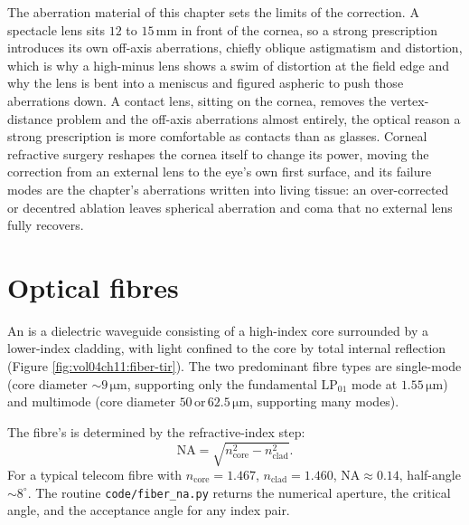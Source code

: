 The aberration material of this chapter sets the limits of the correction. A
spectacle lens sits $12$ to $15\,\si{\milli\meter}$ in front of the cornea, so a
strong prescription introduces its own off-axis aberrations, chiefly oblique
astigmatism and distortion, which is why a high-minus lens shows a swim of
distortion at the field edge and why the lens is bent into a meniscus and figured
aspheric to push those aberrations down. A contact lens, sitting on the cornea,
removes the vertex-distance problem and the off-axis aberrations almost entirely,
the optical reason a strong prescription is more comfortable as contacts than as
glasses. Corneal refractive surgery reshapes the cornea itself to change its
power, moving the correction from an external lens to the eye's own first surface,
and its failure modes are the chapter's aberrations written into living tissue:
an over-corrected or decentred ablation leaves spherical aberration and coma that
no external lens fully recovers.

\section{Optical fibres}

An  is a dielectric waveguide consisting of a
high-index core surrounded by a lower-index cladding, with light
confined to the core by total internal reflection (Figure
\ref{fig:vol04ch11:fiber-tir}). The two
predominant fibre types are single-mode (core diameter $\sim 9\,\si{
\micro\meter}$, supporting only the fundamental $\text{LP}_{01}$
mode at $1.55\,\si{\micro\meter}$) and multimode (core diameter
$50\,$or$\,62.5\,\si{\micro\meter}$, supporting many modes).



The fibre's  is determined by the
refractive-index step:
\[
\text{NA} = \sqrt{n_{\text{core}}^{2} - n_{\text{clad}}^{2}}.
\]
For a typical telecom fibre with $n_{\text{core}} = 1.467$,
$n_{\text{clad}} = 1.460$, $\text{NA} \approx 0.14$, half-angle
$\sim 8^{\circ}$. The routine \texttt{code/fiber\_na.py} returns the
numerical aperture, the critical angle, and the acceptance angle for any
index pair.

